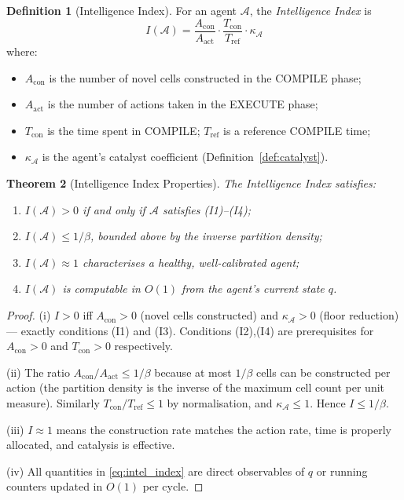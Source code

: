 \documentclass[twocolumn,11pt,a4paper]{article}
\theoremstyle{plain}
\newtheorem{theorem}{Theorem}[section]
\theoremstyle{definition}
\newtheorem{definition}[theorem]{Definition}
\theoremstyle{remark}
\begin{document}
\begin{definition}[Intelligence Index]
\label{def:intel_index}
For an agent $\mathcal{A}$, the \emph{Intelligence Index} is
\begin{equation}
  I(\mathcal{A}) = \frac{A_\mathrm{con}}{A_\mathrm{act}} \cdot \frac{T_\mathrm{con}}{T_\mathrm{ref}} \cdot \kappa_\mathcal{A}
  \label{eq:intel_index}
\end{equation}
where:
\begin{itemize}[noitemsep]
  \item $A_\mathrm{con}$ is the number of novel cells constructed in the COMPILE phase;
  \item $A_\mathrm{act}$ is the number of actions taken in the EXECUTE phase;
  \item $T_\mathrm{con}$ is the time spent in COMPILE; $T_\mathrm{ref}$ is a reference COMPILE time;
  \item $\kappa_\mathcal{A}$ is the agent's catalyst coefficient (Definition~\ref{def:catalyst}).
\end{itemize}
\end{definition}

\begin{theorem}[Intelligence Index Properties]
\label{thm:intel_props}
The Intelligence Index satisfies:
\begin{enumerate}[label=(\roman*)]
  \item $I(\mathcal{A}) > 0$ if and only if $\mathcal{A}$ satisfies (I1)--(I4);
  \item $I(\mathcal{A}) \le 1/\beta$, bounded above by the inverse partition density;
  \item $I(\mathcal{A}) \approx 1$ characterises a healthy, well-calibrated agent;
  \item $I(\mathcal{A})$ is computable in $O(1)$ from the agent's current state $q$.
\end{enumerate}
\end{theorem}

\begin{proof}
(i) $I>0$ iff $A_\mathrm{con} > 0$ (novel cells constructed) and $\kappa_\mathcal{A} > 0$ (floor reduction) — exactly conditions (I1) and (I3).  Conditions (I2),(I4) are prerequisites for $A_\mathrm{con} > 0$ and $T_\mathrm{con} > 0$ respectively.

(ii) The ratio $A_\mathrm{con}/A_\mathrm{act} \le 1/\beta$ because at most $1/\beta$ cells can be constructed per action (the partition density is the inverse of the maximum cell count per unit measure).  Similarly $T_\mathrm{con}/T_\mathrm{ref} \le 1$ by normalisation, and $\kappa_\mathcal{A} \le 1$.  Hence $I \le 1/\beta$.

(iii) $I\approx 1$ means the construction rate matches the action rate, time is properly allocated, and catalysis is effective.

(iv) All quantities in \eqref{eq:intel_index} are direct observables of $q$ or running counters updated in $O(1)$ per cycle.
\end{proof}
\end{document}
